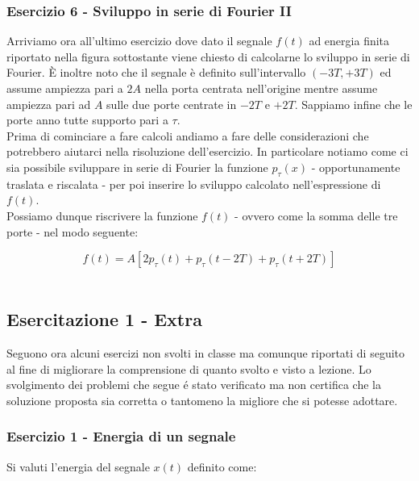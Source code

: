 \documentclass[../main.tex]{subfiles}
\begin{document}
\vspace*{1.5cm}
\subsubsection{Esercizio 6 - Sviluppo in serie di Fourier II}
\label{ss16}

Arriviamo ora all'ultimo esercizio dove dato il segnale $f(t)$ ad energia finita riportato nella figura sottostante viene chiesto di calcolarne lo sviluppo in serie di Fourier.
È inoltre noto che il segnale è definito sull'intervallo $(-3T, +3T)$ ed assume ampiezza pari a $2A$ nella porta centrata nell'origine mentre assume ampiezza pari ad $A$ sulle due porte centrate in $-2T$ e $+2T$. Sappiamo infine che le porte anno tutte supporto pari a $\tau$.\\


Prima di cominciare a fare calcoli andiamo a fare delle considerazioni che potrebbero aiutarci nella risoluzione dell'esercizio.
In particolare notiamo come ci sia possibile sviluppare in serie di Fourier la funzione $p_\tau(x)$ - opportunamente traslata e riscalata - per poi inserire lo sviluppo calcolato nell'espressione di $f(t)$.\\

Possiamo dunque riscrivere la funzione $f(t)$ - ovvero come la somma delle tre porte - nel modo seguente:

\[f(t) = A [2p_\tau(t) + p_\tau(t-2T) + p_\tau(t+2T)] \]\

\vspace*{1.5cm}
\subsection{Esercitazione 1 - Extra}

Seguono ora alcuni esercizi non svolti in classe ma comunque riportati di seguito al fine di migliorare la comprensione di quanto svolto e visto a lezione.
Lo svolgimento dei problemi che segue é stato verificato ma non certifica che la soluzione proposta sia corretta o tantomeno la migliore che si potesse adottare.

\vspace*{1.5cm}
\subsubsection{Esercizio 1 - Energia di un segnale}
\label{extra11}

Si valuti l’energia del segnale $x(t)$ definito come:
\end{document}
